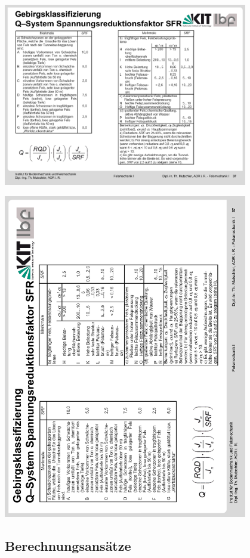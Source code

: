\documentclass[fleqn,twoside]{article}
\begin{document}
\begin{minipage}{0.49\textwidth}
    \includegraphics[width=0.8\textwidth]{Grafiken/SRFa.pdf}
\end{minipage}
\includegraphics[width=0.8\textwidth]{Grafiken/SRFb.pdf}
\subsection{Berechnungsansätze}
\end{document}
